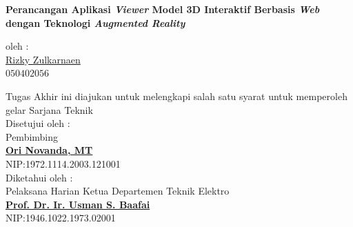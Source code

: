 \documentclass[12pt,a4paper,pdftex,final,oneside,titlepage]{book}
\begin{document}
\thispagestyle{empty} 
\begin{center}{%

\textbf{\large Perancangan Aplikasi \textit{Viewer} Model 3D Interaktif Berbasis \textit{Web} dengan Teknologi \textit{Augmented Reality}}\\[1cm] 

\par 
\vspace{0.4cm} 
oleh : 
\\
{\large\underline{Rizky Zulkarnaen}}\\ 
$050402056$
} 
\vspace{1.4cm} 

Tugas Akhir ini diajukan untuk melengkapi salah satu syarat untuk memperoleh gelar Sarjana Teknik\\[0.2cm] 

Disetujui oleh :\\ 
Pembimbing\\[2.2cm] 
\textbf{\bfseries \underline{Ori Novanda, MT}}\\[0.2cm] 
NIP:1972.1114.2003.121001\\[0.4cm]
Diketahui oleh :\\ 
Pelaksana Harian Ketua Departemen Teknik Elektro\\[2.2cm] 
\textbf{\bfseries \underline{Prof. Dr. Ir. Usman S. Baafai}}\\[0.2cm] 
NIP:1946.1022.1973.02001\\ 

\end{center} 
\pagestyle{fancy}
\lhead{} \chead{} \rhead{\thepage}
\lfoot{} \cfoot{} \rfoot{}
\renewcommand\headrulewidth{0pt}
\renewcommand\footrulewidth{0pt}

\setcounter{tocdepth}{5} 
\setcounter{secnumdepth}{3} %
\end{document}
